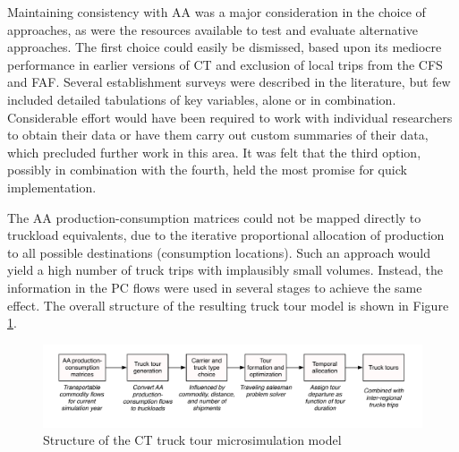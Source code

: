 Maintaining consistency with AA was a major consideration in the choice of approaches, as were the resources available to test and evaluate alternative approaches. The first choice could easily be dismissed, based upon its mediocre performance in earlier versions of CT and exclusion of local trips from the CFS and FAF. Several establishment surveys were described in the literature, but few included detailed tabulations of key variables, alone or in combination. Considerable effort would have been required to work with individual researchers to obtain their data or have them carry out custom summaries of their data, which precluded further work in this area. It was felt that the third option, possibly in combination with the fourth, held the most promise for quick implementation.

The AA production-consumption matrices could not be mapped directly to truckload equivalents, due to the iterative proportional allocation of production to all possible destinations (consumption locations). Such an approach would yield a high number of truck trips with implausibly small volumes. Instead, the information in the PC flows were used in several stages to achieve the same effect. The overall structure of the resulting truck tour model is shown in Figure \ref{fig:ct-tour-model}.

\begin{figure}
\centering
\includegraphics[width=6.25in, trim=0mm 8mm 0mm 0mm]{figures/ct-tour-model.pdf}
\caption{Structure of the CT truck tour microsimulation model}
\label{fig:ct-tour-model}
\end{figure}




